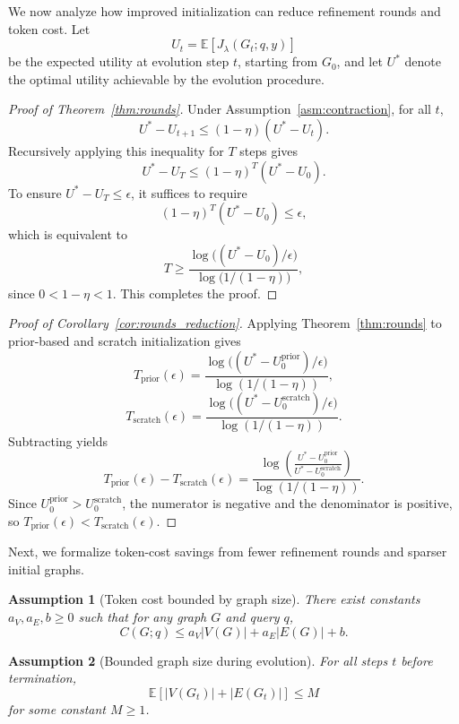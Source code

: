 \documentclass[lettersize,journal]{IEEEtran}
\theoremstyle{plain}
\newtheorem{assumption}{Assumption}
\begin{document}
We now analyze how improved initialization can reduce refinement rounds and token cost. Let
\[
U_t = \mathbb{E}[J_\lambda(G_t; q, y)]
\]
be the expected utility at evolution step $t$, starting from $G_0$, and let $U^*$ denote the optimal utility achievable by the evolution procedure.

\begin{proof}[Proof of Theorem~\ref{thm:rounds}]
Under Assumption~\ref{asm:contraction}, for all $t$,
\[
U^* - U_{t+1} \le (1-\eta)(U^* - U_t).
\]
Recursively applying this inequality for $T$ steps gives
\[
U^* - U_T \le (1-\eta)^T (U^* - U_0).
\]
To ensure $U^* - U_T \le \epsilon$, it suffices to require
\[
(1-\eta)^T (U^* - U_0) \le \epsilon,
\]
which is equivalent to
\[
T \ge \frac{\log\bigl((U^* - U_0)/\epsilon\bigr)}{\log\bigl(1/(1-\eta)\bigr)},
\]
since $0<1-\eta<1$. This completes the proof.
\end{proof}

\begin{proof}[Proof of Corollary~\ref{cor:rounds_reduction}]
Applying Theorem~\ref{thm:rounds} to prior-based and scratch initialization gives
\[
T_{\mathrm{prior}}(\epsilon)
=
\frac{\log\bigl((U^* - U_0^{\mathrm{prior}})/\epsilon\bigr)}
{\log(1/(1-\eta))},
\]
\[
T_{\mathrm{scratch}}(\epsilon)
=
\frac{\log\bigl((U^* - U_0^{\mathrm{scratch}})/\epsilon\bigr)}
{\log(1/(1-\eta))}.
\]
Subtracting yields
\[
T_{\mathrm{prior}}(\epsilon) - T_{\mathrm{scratch}}(\epsilon)
=
\frac{\log\!\left(\frac{U^* - U_0^{\mathrm{prior}}}{U^* - U_0^{\mathrm{scratch}}}\right)}
{\log(1/(1-\eta))}.
\]
Since $U_0^{\mathrm{prior}} > U_0^{\mathrm{scratch}}$, the numerator is negative and the denominator is positive, so $T_{\mathrm{prior}}(\epsilon) < T_{\mathrm{scratch}}(\epsilon)$.
\end{proof}

Next, we formalize token-cost savings from fewer refinement rounds and sparser initial graphs.

\begin{assumption}[Token cost bounded by graph size]
\label{asm:token_size}
There exist constants $a_V, a_E, b \ge 0$ such that for any graph $G$ and query $q$,
\[
C(G; q) \le a_V |V(G)| + a_E |E(G)| + b.
\]
\end{assumption}

\begin{assumption}[Bounded graph size during evolution]
\label{asm:graph_size}
For all steps $t$ before termination,
\[
\mathbb{E}[|V(G_t)| + |E(G_t)|] \le M
\]
for some constant $M \ge 1$.
\end{assumption}
\end{document}
